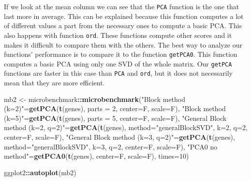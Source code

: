 \documentclass[]{article}
\newenvironment{Shaded}{\begin{snugshade}}{\end{snugshade}}
\newcommand{\KeywordTok}[1]{\textcolor[rgb]{0.13,0.29,0.53}{\textbf{#1}}}
\newcommand{\DataTypeTok}[1]{\textcolor[rgb]{0.13,0.29,0.53}{#1}}
\newcommand{\DecValTok}[1]{\textcolor[rgb]{0.00,0.00,0.81}{#1}}
\newcommand{\StringTok}[1]{\textcolor[rgb]{0.31,0.60,0.02}{#1}}
\newcommand{\OperatorTok}[1]{\textcolor[rgb]{0.81,0.36,0.00}{\textbf{#1}}}
\newcommand{\NormalTok}[1]{#1}
\begin{document}
If we look at the mean column we can see that the \texttt{PCA} function
is the one that last more in average. This can be explained because this
function computes a lot of different values a part from the necessary
ones to compute a basic PCA. This also happens with function
\texttt{ord}. These functions compute other scores and it makes it
difficult to compare them with the others. The best way to analyze our
functions' performance is to compare it to the function
\texttt{getPCA0}. This function computes a basic PCA using only one SVD
of the whole matrix. Our \texttt{getPCA} functions are faster in this
case than \texttt{PCA} and \texttt{ord}, but it does not necessarily
mean that they are more efficient.

\begin{Shaded}
\begin{Highlighting}[]
\NormalTok{mb2 <-}\StringTok{ }\NormalTok{microbenchmark}\OperatorTok{::}\KeywordTok{microbenchmark}\NormalTok{(}\StringTok{"Block method (k=2)"}\NormalTok{=}\KeywordTok{getPCA}\NormalTok{(}\KeywordTok{t}\NormalTok{(genes), }\DataTypeTok{parts =} \DecValTok{2}\NormalTok{, }\DataTypeTok{center=}\NormalTok{F, }\DataTypeTok{scale=}\NormalTok{F),}
                               \StringTok{"Block method (k=5)"}\NormalTok{=}\KeywordTok{getPCA}\NormalTok{(}\KeywordTok{t}\NormalTok{(genes), }\DataTypeTok{parts =} \DecValTok{5}\NormalTok{, }\DataTypeTok{center=}\NormalTok{F, }\DataTypeTok{scale=}\NormalTok{F),}
                               \StringTok{"General Block method (k=2, q=2)"}\NormalTok{=}\KeywordTok{getPCA}\NormalTok{(}\KeywordTok{t}\NormalTok{(genes), }\DataTypeTok{method=}\StringTok{"generalBlockSVD"}\NormalTok{, }\DataTypeTok{k=}\DecValTok{2}\NormalTok{, }\DataTypeTok{q=}\DecValTok{2}\NormalTok{, }\DataTypeTok{center=}\NormalTok{F, }\DataTypeTok{scale=}\NormalTok{F),}
                               \StringTok{"General Block method (k=3, q=2)"}\NormalTok{=}\KeywordTok{getPCA}\NormalTok{(}\KeywordTok{t}\NormalTok{(genes), }\DataTypeTok{method=}\StringTok{"generalBlockSVD"}\NormalTok{, }\DataTypeTok{k=}\DecValTok{3}\NormalTok{, }\DataTypeTok{q=}\DecValTok{2}\NormalTok{, }\DataTypeTok{center=}\NormalTok{F, }\DataTypeTok{scale=}\NormalTok{F),}
                               \StringTok{"PCA0 no method"}\NormalTok{=}\KeywordTok{getPCA0}\NormalTok{(}\KeywordTok{t}\NormalTok{(genes), }\DataTypeTok{center=}\NormalTok{F, }\DataTypeTok{scale=}\NormalTok{F),  }\DataTypeTok{times=}\DecValTok{10}\NormalTok{)}

\NormalTok{ggplot2}\OperatorTok{::}\KeywordTok{autoplot}\NormalTok{(mb2)}
\end{Highlighting}
\end{Shaded}
\end{document}
